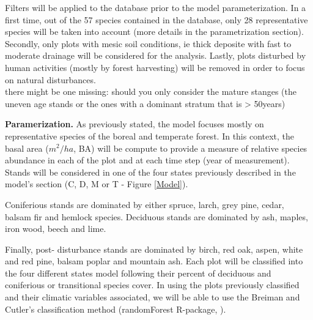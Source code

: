 Filters will be applied to the database prior to the model parameterization.
In a first time, out of the 57 species contained in the  database, only 28
representative species will be taken into account (more details in the
parametrization section). Secondly,  only plots with mesic soil conditions, ie
thick deposite with fast to moderate drainage will be considered for the
analysis. Lastly, plots disturbed by human activities (mostly by forest
harvesting) will be removed in order to focus on natural disturbances. \\ %
there might be one missing: should you only consider the mature stanges (the
uneven age stands or the ones with a dominant stratum that is > 50years)


\textbf{Paramerization.} As previously stated, the model focuses mostly on
representative species of the boreal and temperate forest. In this context, the basal area ($m^2/ha$, BA) will be compute to
provide a measure of relative species abundance in each of the
plot and at each time step (year of measurement). Stands will be considered in one of the four states 
previously described in the model's
section (C, D, M or T - Figure \ref{Model}).


 Coniferious stands are dominated by either spruce, larch, grey pine, cedar,
balsam fir and hemlock species. Deciduous stands are dominated by ash, maples,
iron wood, beech and lime.


Finally, post- disturbance stands are dominated by birch, red oak, aspen,
white and red pine, balsam poplar and mountain ash. Each plot will be
classified into the four different states model following their percent of
deciduous and coniferious or transitional species cover. In using the plots
previously classified and their climatic variables associated, we will be able
to use the Breiman and Cutler's classification method (randomForest R-package,
\cite{Liaw2002a}).

%

